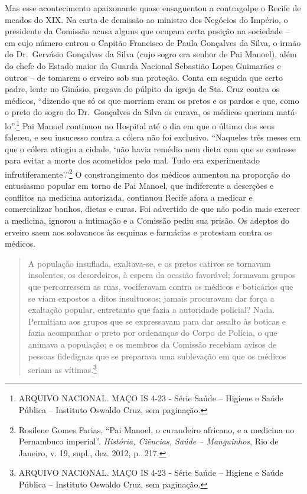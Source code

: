 Mas esse acontecimento apaixonante quase ensaguentou a contragolpe o
Recife de meados do XIX. Na carta de demissão ao ministro dos Negócios
do Império, o presidente da Comissão acusa alguns que ocupam certa
posição na sociedade -- em cujo número entrou o Capitão Francisco de
Paula Gonçalves da Silva, o irmão do Dr.~Gervásio Gonçalves da Silva
(cujo sogro era senhor de Pai Manoel), além do chefe do Estado maior da
Guarda Nacional Sebastião Lopes Guimarães e outros -- de tomarem o
erveiro sob sua proteção. Conta em seguida que certo padre, lente no
Ginásio, pregava do púlpito da igreja de Sta. Cruz contra os médicos,
``dizendo que só os que morriam eram os pretos e os pardos e que, como o
preto do sogro do Dr.~Gonçalves da Silva os curava, os médicos queriam
matá-lo''.\footnote{ARQUIVO NACIONAL. MAÇO IS 4-23 - Série Saúde --
  Higiene e Saúde Pública -- Instituto Oswaldo Cruz, sem paginação.} Pai
Manoel continuou no Hospital até o dia em que o último dos seus faleceu,
e seu insucesso contra a cólera não foi exclusivo. ``Naqueles três meses
em que o cólera atingiu a cidade, `não havia remédio nem dieta com que
se contasse para evitar a morte dos acometidos pelo mal. Tudo era
experimentado infrutiferamente'.''\footnote{Rosilene Gomes Farias, ``Pai
  Manoel, o curandeiro africano, e a medicina no Pernambuco imperial''.
  \emph{História, Ciências, Saúde -- Manguinhos}, Rio de Janeiro, v. 19,
  supl., dez. 2012, p.~217.} O constrangimento dos médicos aumentou na
proporção do entusiasmo popular em torno de Pai Manoel, que indiferente
a deserções e conflitos na medicina autorizada, continuou Recife afora a
medicar e comercializar banhos, dietas e curas. Foi advertido de que não
podia mais exercer a medicina, ignorou a intimação e a Comissão pediu
sua prisão. Os adeptos do erveiro saem aos solavancos às esquinas e
farmácias e protestam contra os médicos.

\begin{quote}
A população insuflada, exaltava-se, e os pretos cativos se tornavam
insolentes, os desordeiros, à espera da ocasião favorável; formavam
grupos que percorressem as ruas, vociferavam contra os médicos e
boticários que se viam expostos a ditos insultuosos; jamais procuravam
dar força a exaltação popular, entretanto que fazia a autoridade
policial? Nada. Permitiam aos grupos que se expressavam para dar assalto
às boticas e fazia acompanhar o preto por ordenanças do Corpo de
Polícia, o que animava a população; e os membros da Comissão recebiam
avisos de pessoas fidedignas que se preparava uma sublevação em que os
médicos seriam as vítimas.\footnote{ARQUIVO NACIONAL. MAÇO IS 4-23 -
  Série Saúde -- Higiene e Saúde Pública -- Instituto Oswaldo Cruz, sem
  paginação.}
\end{quote}

